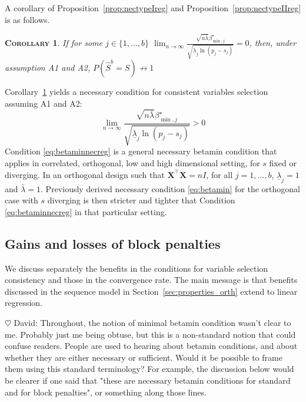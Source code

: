 \documentclass[aos]{imsart}
\theoremstyle{plain}
\newtheorem{cor}{\textsc{Corollary}}[section]
\newcommand{\david}[1]{{\small{\color{blue} \sf $\heartsuit$ David: #1}}}
\newcommand{\paul}[1]{{\small{\color{green} \sf $\spadesuit$ Paul: #1}}}
\newcommand{\bs}{\boldsymbol}
\begin{document}
A corollary of Proposition~\ref{prop:nectypeIreg} and Proposition~\ref{prop:nectypeIIreg} is as follows. 
\begin{cor}\label{cor:necrecovreg}
    If for some $j\in\{1,\ldots,b\}$   $\lim_{n\to\infty}\frac{\sqrt{n\bar{\lambda}}\beta_{\min,j}^{\star}}{\sqrt{\underline{\lambda}_j\ln(p_j-s_j)}} = 0$, then, under assumption A1 and A2,  $P(\hat{S}^b=S)\not\to 1$
\end{cor}
Corollary~\ref{cor:necrecovreg} yields a necessary condition for consistent variables selection assuming A1 and A2:
\begin{equation}\label{eq:betaminnecreg}
\lim_{n\to\infty}\frac{\sqrt{n\bar{\lambda}}\beta_{\min,j}^{\star}}{\sqrt{\underline{\lambda}_j\ln(p_j-s_j)}} > 0
\end{equation}
Condition \eqref{eq:betaminnecreg} is a general necessary betamin condition that applies in correlated, orthogonal, low and high dimensional setting, for $s$ fixed or diverging. In an orthogonal design such that $\bs X^{\top} \bs X=nI$, for all $j=1,\ldots,b$, $\underline{\lambda}_j=1$ and $\bar{\lambda}=1$. Previously derived necessary condition \eqref{eq:betamin} for the orthogonal case with $s$ diverging is then stricter and tighter that Condition \eqref{eq:betaminnecreg} in that particular setting.


\subsection{Gains and losses of block penalties}
\label{ssec:regression_gains}

We discuss separately the benefits in the conditions for variable selection consistency and those in the convergence rate. The main message %
is that benefits discussed in the sequence model in Section~\ref{sec:properties_orth} extend to linear regression.
\bigskip

\david{Throughout, the notion of minimal betamin condition wasn't clear to me. Probably just me being obtuse, but this is a non-standard notion that could confuse readers. People are used to hearing about betamin conditions, and about whether they are either necessary or sufficient. Would it be possible to frame them using this standard terminology? For example, the discussion below would be clearer if one said that "these are necessary betamin conditions for standard and for block penalties", or something along those lines.}
\end{document}
